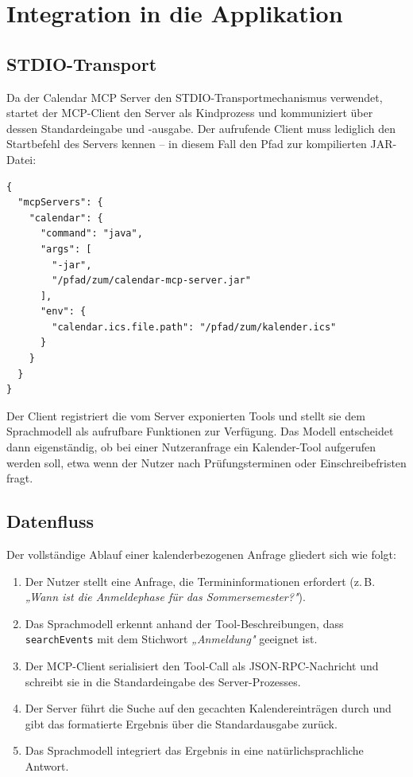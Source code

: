 \section{Integration in die Applikation}

\subsection{STDIO-Transport}

Da der Calendar MCP Server den STDIO-Transportmechanismus verwendet, startet der
MCP-Client den Server als Kindprozess und kommuniziert über dessen Standard\-eingabe
und -ausgabe. Der aufrufende Client muss lediglich den Startbefehl des Servers kennen
-- in diesem Fall den Pfad zur kompilierten JAR-Datei:

\begin{lstlisting}[caption={Exemplarische MCP-Client-Konfiguration (JSON)}]
{
  "mcpServers": {
    "calendar": {
      "command": "java",
      "args": [
        "-jar",
        "/pfad/zum/calendar-mcp-server.jar"
      ],
      "env": {
        "calendar.ics.file.path": "/pfad/zum/kalender.ics"
      }
    }
  }
}
\end{lstlisting}

Der Client
registriert die vom Server exponierten Tools und stellt sie dem Sprachmodell als
aufrufbare Funktionen zur Verfügung. Das Modell entscheidet dann eigenständig, ob
bei einer Nutzeranfrage ein Kalender-Tool aufgerufen werden soll, etwa wenn der Nutzer
nach Prüfungsterminen oder Einschreibefristen fragt.

\subsection{Datenfluss}

Der vollständige Ablauf einer kalenderbezogenen Anfrage gliedert sich wie folgt:

\begin{enumerate}
    \item Der Nutzer stellt eine Anfrage, die Termininformationen erfordert (z.\,B.
    \emph{„Wann ist die Anmeldephase für das Sommersemester?"}).
    \item Das Sprachmodell erkennt anhand der Tool-Beschreibungen, dass
    \texttt{searchEvents} mit dem Stichwort \emph{„Anmeldung"} geeignet ist.
    \item Der MCP-Client serialisiert den Tool-Call als JSON-RPC-Nachricht und schreibt
    sie in die Standard\-eingabe des Server-Prozesses.
    \item Der Server führt die Suche auf den gecachten Kalendereinträgen durch und
    gibt das formatierte Ergebnis über die Standard\-ausgabe zurück.
    \item Das Sprachmodell integriert das Ergebnis in eine natürlichsprachliche Antwort.
\end{enumerate}

